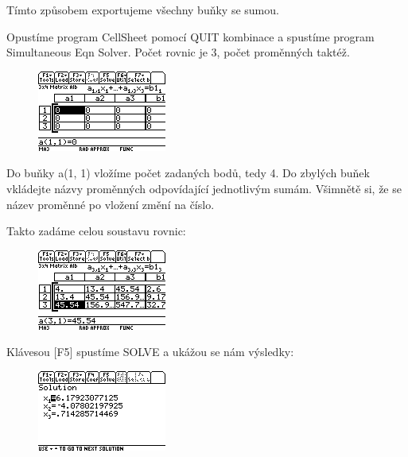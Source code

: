 \documentclass[10pt,a4paper,float]{article}
\begin{document}
Tímto způsobem exportujeme všechny buňky se sumou.

Opustíme program CellSheet pomocí QUIT kombinace a spustíme program Simultaneous Eqn Solver. Počet rovnic je 3, počet proměnných taktéž.

\begin{figure}[H]
	\centering
	\includegraphics[width=.5\textwidth]{img/CTVERCE9.PNG}
\end{figure}

Do buňky a(1, 1) vložíme počet zadaných bodů, tedy 4. Do zbylých buňek vkládejte názvy proměnných odpovídající jednotlivým sumám. Všimnětě si, že se název proměnné po vložení změní na číslo.

Takto zadáme celou soustavu rovnic:

\begin{figure}[H]
	\centering
	\includegraphics[width=.5\textwidth]{img/CTVERCE10.PNG}
\end{figure}

\pagebreak

Klávesou [F5] spustíme SOLVE a ukážou se nám výsledky:

\begin{figure}[H]
	\centering
	\includegraphics[width=.5\textwidth]{img/CTVERCE11.PNG}
\end{figure}
\end{document}

